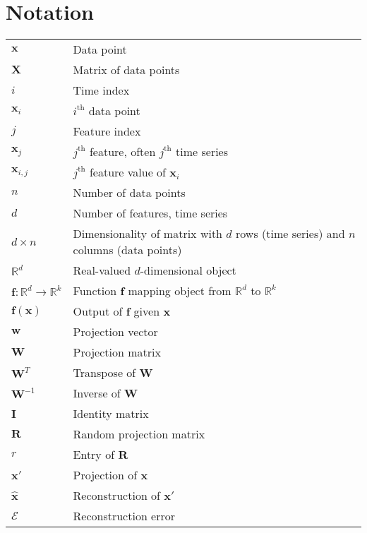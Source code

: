 \chapter*{Notation}
\label{chap:notation}

\begin{table}[h]
	\centering
\begin{tabular}{l l}
			${\mathbf x}$						&		Data point\\
			${\mathbf X}$						&		Matrix of data points\\
			$i$									&		Time index\\						
			${\mathbf x_i}$						&		$i^\text{th}$ data point\\
			$j$									&		Feature index\\
			$\mathbf{x}_j$						&		$j^{\text{th}}$ feature, often $j^{\text{th}}$ time series\\
			${\mathbf x}_{i,j}$					&		$j^\text{th}$ feature value of ${\mathbf x_i}$\\
			
			$n$									&		Number of data points\\
			$d$									&		Number of features, time series\\
			$d \times n$						&		Dimensionality of matrix with $d$ rows (time series) and $n$ columns (data points)\\
			$\mathbb{R}^d$						&		Real-valued $d$-dimensional object\\
			
	$\mathbf{f} : \mathbb{R}^d \to \mathbb{R}^k$&		Function $\mathbf{f}$ mapping object from $\mathbb{R}^d$ to $\mathbb{R}^k$\\
			${\mathbf f}({\mathbf x})$			&		Output of $\mathbf{f}$ given ${\mathbf x}$\\
			${\mathbf w}$						&		Projection vector\\
			${\mathbf W}$						&		Projection matrix\\
			${\mathbf W}^T$						&		Transpose of $\mathbf{W}$\\		
			${\mathbf W}^{-1}$					&		Inverse of $\mathbf{W}$\\
			${\mathbf I}$						&		Identity matrix\\	
			${\mathbf R}$						&		Random projection matrix\\	
			$r$									&		Entry of $\mathbf{R}$\\
			${\mathbf x}'$						&		Projection of ${\mathbf x}$\\
			$\hat{{\mathbf x}}$					&		Reconstruction of ${\mathbf x}'$\\
			$\mathcal{E}$						&		Reconstruction error\\
						

\end{tabular}
\end{table}
